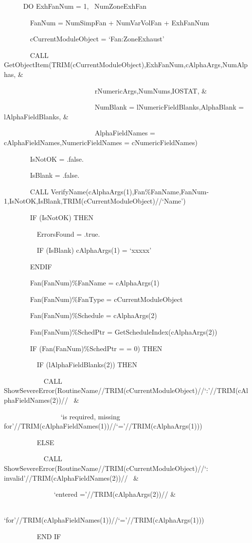 ~~~~~ DO ExhFanNum = 1,~ NumZoneExhFan

~~~~~~~ FanNum = NumSimpFan + NumVarVolFan + ExhFanNum

~~~~~~~ cCurrentModuleObject = `Fan:ZoneExhaust'

~~~~~~~ CALL GetObjectItem(TRIM(cCurrentModuleObject),ExhFanNum,cAlphaArgs,NumAlphas, \&

~~~~~~~~~~~~~~~~~~~~~~~~~~ rNumericArgs,NumNums,IOSTAT, \&

~~~~~~~~~~~~~~~~~~~~~~~~~~ NumBlank = lNumericFieldBlanks,AlphaBlank = lAlphaFieldBlanks, \&

~~~~~~~~~~~~~~~~~~~~~~~~~~ AlphaFieldNames = cAlphaFieldNames,NumericFieldNames = cNumericFieldNames)

~~~~~~~ IsNotOK = .false.

~~~~~~~ IsBlank = .false.

~~~~~~~ CALL VerifyName(cAlphaArgs(1),Fan\%FanName,FanNum-1,IsNotOK,IsBlank,TRIM(cCurrentModuleObject)//`Name')

~~~~~~~ IF (IsNotOK) THEN

~~~~~~~~~ ErrorsFound = .true.

~~~~~~~~~ IF (IsBlank) cAlphaArgs(1) = `xxxxx'

~~~~~~~ ENDIF

~~~~~~~ Fan(FanNum)\%FanName = cAlphaArgs(1)

~~~~~~~ Fan(FanNum)\%FanType = cCurrentModuleObject

~~~~~~~ Fan(FanNum)\%Schedule = cAlphaArgs(2)

~~~~~~~ Fan(FanNum)\%SchedPtr = GetScheduleIndex(cAlphaArgs(2))

~~~~~~~ IF (Fan(FanNum)\%SchedPtr = = 0) THEN

~~~~~~~~~ IF (lAlphaFieldBlanks(2)) THEN

~~~~~~~~~~~ CALL ShowSevereError(RoutineName//TRIM(cCurrentModuleObject)//`:'//TRIM(cAlphaFieldNames(2))//~ \&

~~~~~~~~~~~~~~~~ `is required, missing for'//TRIM(cAlphaFieldNames(1))//`='//TRIM(cAlphaArgs(1)))

~~~~~~~~~ ELSE

~~~~~~~~~~~ CALL ShowSevereError(RoutineName//TRIM(cCurrentModuleObject)//`: invalid'//TRIM(cAlphaFieldNames(2))//~ \&

~~~~~~~~~~~~~~ `entered ='//TRIM(cAlphaArgs(2))// \&

~~~~~~~~~~~~~~ `for'//TRIM(cAlphaFieldNames(1))//`='//TRIM(cAlphaArgs(1)))

~~~~~~~~~ END IF

